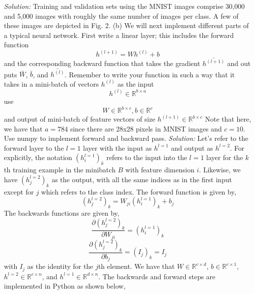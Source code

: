 \documentclass[12pt]{article}
\begin{document}
\emph{Solution:}  \newline 
Training and validation sets using the MNIST images comprise 30,000 and 5,000 images with roughly the same number of images per class. A few of these images are  depicted in Fig. 2.  
\newline \newline 
(b)  We will next implement different parts of a typical neural network. First write a linear
layer; this includes the forward function
$$ h^{(l+1)} = Wh^{(l)}   + b $$
and the corresponding backward function that takes the gradient $\bar{h^{(l+1)} }$ and out puts $\bar{W}$, $\bar{b}$, and $\bar{h^{(l)}}$. Remember to write your function in such a way that it takes in a mini-batch of vectors $h^{(l)}$ as the input
$$ h^{(l)}  \in \mathbb{R}^{b\times a}$$ 
use 
$$W \in  \mathbb{R}^{b\times c}, b \in  \mathbb{R}^{c}$$  
and output of mini-batch of feature vectors of size $ h^{(l+1)} \in  \mathbb{R}^{b\times c}$
Note that here, we have that $a=784$ since there are 28x28 pixels in MNIST images and $c=10$.  Use numpy to implement forward and backward pass.   \newline  \newline 
\emph{Solution:}  \newline  
Let's refer to the forward layer to the $l=1$ layer with the input as $h^{l=1}$ and output as $h^{l=2}$. For explicitly, the notation $(h_{i}^{l=1} )_{k}$   refers to the input into the $l=1$ layer for the $k$th training example in the minibatch $B$ with feature dimension $i$.  Likewise, we have  $(h_{j}^{l=2} )_{k}$ as the output, with all the same indices as in the first input except for $j$ which refers to the class index. The forward function is given by,  \newline  
$$ (h_{j}^{l=2} )_{k}  = W_{ji} (h_{i}^{l=1} )_{k} + b_{j} $$
The backwards functions are given by, 
$$ \frac{\partial  (h_{j}^{l=2} )_{k} }{\partial   W_{ji} }   =  (h_{i}^{l=1} )_{k}  $$
$$ \frac{\partial  (h_{j}^{l=2} )_{k} }{\partial   b_{j} }   =   (I_{j })_{k} =  I_{j }  $$
with $I_{j}$ as the identity for the $j$th element.  We have that $W \in \mathbb{R}^{c\times d} $, $b \in \mathbb{R}^{c\times 1}$,  $h^{l=2} \in  \mathbb{R}^{c\times n}$, and   $h^{l=1} \in  \mathbb{R}^{d\times n}$.  The backwards and forward steps are implemented in Python as shown below, \newline 
\end{document}
